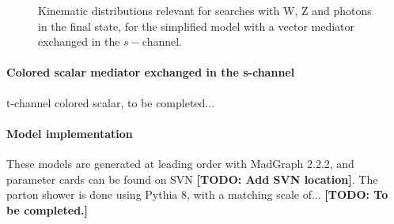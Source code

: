 \begin{figure}[h!]
{    }
    \hfill
    \caption{Kinematic distributions relevant for searches with W, Z and photons in the final state,
    for the simplified model with a vector mediator exchanged in the $s-$channel.}
    \label{fig:DMV_EW_kinematics}
\end{figure}

\paragraph{Colored scalar mediator exchanged in the s-channel}

t-channel colored scalar, to be completed...

\paragraph{Model implementation}

These models are generated at leading order with MadGraph 2.2.2, and parameter
cards can be found on SVN \textbf{[TODO: Add SVN location]}.
The parton shower is done using Pythia 8, with a matching scale of...
\textbf{[TODO: To be completed.]}


